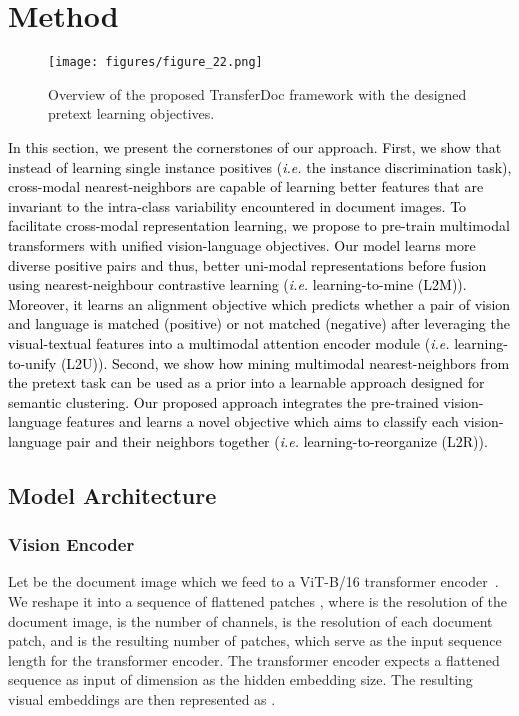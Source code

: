 \documentclass[preprint,review,12pt]{elsarticle}
\newcommand{\ie}{\textit{i.e. }}
\begin{document}
 
\section{Method}
\label{sec:method}
\begin{figure*}[t]
  \centering
  \texttt{[image: figures/figure\_22.png]}
  \caption{Overview of the proposed TransferDoc framework with the designed pretext learning objectives.}
  \label{fig:figure_5.1}
\end{figure*}
\textcolor{black}{In this section, we present the cornerstones of our approach. First, we show that instead of learning single instance positives (\ie the instance discrimination task), cross-modal nearest-neighbors are capable of learning better features that are invariant to the intra-class variability encountered in document images. To facilitate cross-modal representation learning, we propose to pre-train multimodal transformers with unified vision-language objectives. Our model learns more diverse positive pairs and thus, better uni-modal representations before fusion using nearest-neighbour contrastive learning (\ie learning-to-mine (L2M)). Moreover, it learns an alignment objective which predicts whether a pair of vision and language is matched (positive) or not matched (negative) after leveraging the visual-textual features into a multimodal attention encoder module (\ie learning-to-unify (L2U)). Second, we show how mining multimodal nearest-neighbors from the pretext task can be used as a prior into a learnable approach designed for semantic clustering. Our proposed approach integrates the pre-trained vision-language features and learns a novel objective which aims to classify each vision-language pair and their neighbors together (\ie learning-to-reorganize (L2R)).}

\subsection{Model Architecture}


\subsubsection{Vision Encoder}
Let  be the document image which we feed to a ViT-B/16 transformer encoder~\cite{dosovitskiy2020image}. We reshape it into a sequence of flattened  patches , where  is the resolution of the document image,  is the number of channels,  is the resolution of each document patch, and  is the resulting number of patches, which serve as the input sequence length for the transformer encoder. The transformer encoder expects a flattened sequence as input of  dimension as the hidden embedding size. The resulting visual embeddings are then represented as .
\end{document}
